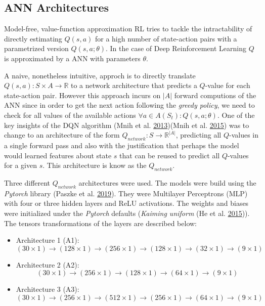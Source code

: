 \documentclass[
  openany]{book}
\providecommand{\tightlist}{%
  \setlength{\itemsep}{0pt}\setlength{\parskip}{0pt}}
\begin{document}
\hypertarget{ann-architectures}{%
\subsection{ANN Architectures}\label{ann-architectures}}

Model-free, value-function approximation RL tries to tackle the intractability of directly estimating \(Q(s,a)\) for a high number of state-action pairs with a parametrized version \(Q(s,a;\theta)\). In the case of Deep Reinforcement Learning \(Q\) is approximated by a ANN with parameters \(\theta\).

A naive, nonetheless intuitive, approch is to directly translate \(Q(s,a): S \times A \to \mathds{R}\) to a network architecture that predicts a \(Q\)-value for each state-action pair. However this approach incurs on \(|A|\) forward computions of the ANN since in order to get the next action following the \emph{greedy policy}, we need to check for all values of the available actions \(\forall a \in A(S_t): Q(s,a;\theta)\). One of the key insights of the DQN algorithm (Mnih et al. \protect\hyperlink{ref-mnih2013playing}{2013})(Mnih et al. \protect\hyperlink{ref-mnih2015human}{2015}) was to change to an architecture of the form \(Q_{network}: S \to \mathds{R}^{|A|}\), predicting all \(Q\)-values in a single forward pass and also with the justification that perhaps the model would learned features about state \(s\) that can be reused to predict all \(Q\)-values for a given \(s\). This architecture is know as the \(Q_{network}\).

Three different \(Q_{network}\) architectures were used. The models were build using the \emph{Pytorch} library (Paszke et al. \protect\hyperlink{ref-NEURIPS2019_9015}{2019}). They were Multilayer Perceptrons (MLP) with four or three hidden layers and ReLU activations. The weights and biases were initialized under the \emph{Pytorch} defaults (\emph{Kaiming uniform} (He et al. \protect\hyperlink{ref-he2015delving}{2015})). The tensors transformations of the layers are described below:

\begin{itemize}
\tightlist
\item
  Architecture 1 (A1):
  \[(30 \times 1) \to (128 \times 1) \to (256 \times 1) \to (128 \times 1) \to (32 \times 1) \to (9 \times 1)\]
\item
  Architecture 2 (A2):
  \[(30 \times 1) \to (256 \times 1) \to (128 \times 1) \to (64 \times 1) \to (9 \times 1)\]
\item
  Architecture 3 (A3):
  \[(30 \times 1) \to (256 \times 1) \to (512 \times 1) \to (256 \times 1) \to (64 \times 1) \to (9 \times 1)\]
\end{itemize}
\end{document}
